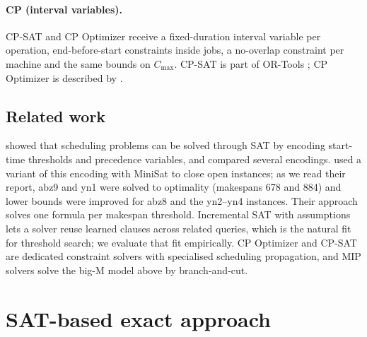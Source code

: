 \documentclass[a4paper,fleqn]{cas-sc}
\newcommand{\Cmax}{C_{\max}}
\begin{document}
\paragraph{CP (interval variables).}
CP-SAT and CP Optimizer receive a fixed-duration interval variable per operation, end-before-start constraints inside jobs, a no-overlap constraint per machine and the same bounds on $\Cmax$.
CP-SAT is part of OR-Tools \citep{ortools}; CP Optimizer is described by \citet{laborie2018}.

\subsection{Related work}
\citet{crawford1994} showed that scheduling problems can be solved through SAT by encoding start-time thresholds and precedence variables, and compared several encodings.
\citet{koshimura2010} used a variant of this encoding with MiniSat to close open instances; as we read their report, abz9 and yn1 were solved to optimality (makespans 678 and 884) and lower bounds were improved for abz8 and the yn2--yn4 instances.
Their approach solves one formula per makespan threshold.
Incremental SAT with assumptions \citep{een2003temporal} lets a solver reuse learned clauses across related queries, which is the natural fit for threshold search; we evaluate that fit empirically.
CP Optimizer \citep{laborie2018} and CP-SAT \citep{ortools} are dedicated constraint solvers with specialised scheduling propagation, and MIP solvers solve the big-M model above by branch-and-cut.

\section{SAT-based exact approach}\label{sec:enc}
\end{document}
